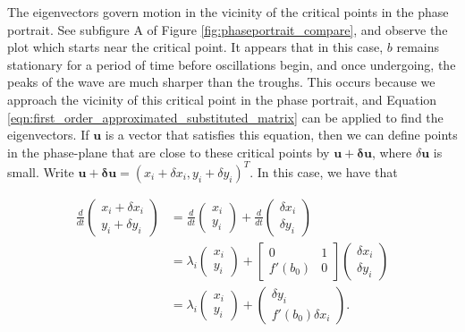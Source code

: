 \documentclass{article}
\begin{document}
The eigenvectors govern motion in the vicinity of the critical points in the phase portrait.
See subfigure A of Figure \ref{fig:phaseportrait_compare}, and observe the plot which starts near the critical point.
It appears that in this case, $b$ remains stationary for a period of time before oscillations begin,
and once undergoing, the peaks of the wave are much sharper than the troughs.
This occurs because we approach the vicinity of this critical point in the phase portrait,
and Equation \ref{eqn:first_order_approximated_substituted_matrix} can be applied to find the eigenvectors.
If $\mathbf{u}$ is a vector that satisfies this equation,
then we can define points in the phase-plane that are close to these critical points by $\mathbf{u} + \mathbf{\delta u}$,
where $\delta\mathbf{u}$ is small.
Write $\mathbf{u + \delta u} = (x_i + \delta x_i, y_i + \delta y_i)^T$.
In this case, we have that

\begin{align}
    \frac{d}{dt} \begin{pmatrix}
        x_i + \delta x_i\\
        y_i + \delta y_i
    \end{pmatrix} &= \frac{d}{dt}\begin{pmatrix}
        x_i \\
        y_i
    \end{pmatrix} + \frac{d}{dt}\begin{pmatrix}
        \delta x_i \\
        \delta y_i
    \end{pmatrix} \\
    &= \lambda_i \begin{pmatrix}
        x_i \\
        y_i
    \end{pmatrix} + \begin{bmatrix}
        0 & 1 \\
        f'(b_0) & 0
    \end{bmatrix} \begin{pmatrix} %
        \delta x_i \\
        \delta y_i
    \end{pmatrix} \\
    &= \lambda_i \begin{pmatrix}
        x_i \\
        y_i
    \end{pmatrix} + \begin{pmatrix}
        \delta y_i \\
        f'(b_0) \delta x_i
    \end{pmatrix}.
    \label{eqn:matrix_eigenvectors_vicinity}
\end{align}
\end{document}
